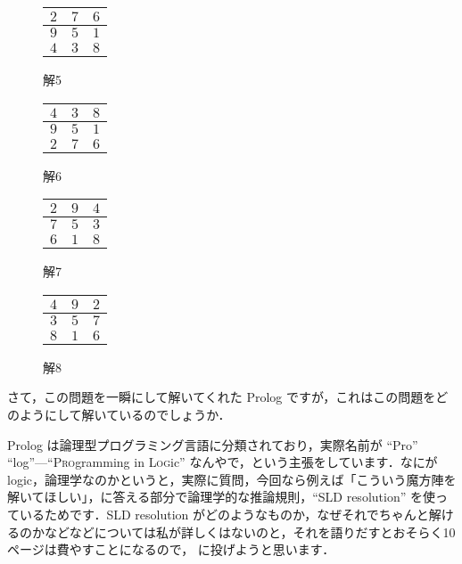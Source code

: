 \documentclass[11pt]{jsarticle}
\begin{document}
\begin{figure}[htbp]
  \captionsetup{labelformat=empty}
  \begin{minipage}{0.24\hsize}
    \centering
    \begin{tabular}{|c|c|c|}
      \hline
      $2$ & $7$ & $6$ \\ \hline
      $9$ & $5$ & $1$ \\ \hline
      $4$ & $3$ & $8$ \\ \hline
    \end{tabular}
    \caption{解5}
    \hypertarget{ans}{}
    \label{}
  \end{minipage}
  \begin{minipage}{0.24\hsize}
    \centering
    \begin{tabular}{|c|c|c|}
      \hline
      $4$ & $3$ & $8$ \\ \hline
      $9$ & $5$ & $1$ \\ \hline
      $2$ & $7$ & $6$ \\ \hline
    \end{tabular}
    \caption{解6}
    \label{}
  \end{minipage}
  \begin{minipage}{0.24\hsize}
    \centering
    \begin{tabular}{|c|c|c|}
      \hline
      $2$ & $9$ & $4$ \\ \hline
      $7$ & $5$ & $3$ \\ \hline
      $6$ & $1$ & $8$ \\ \hline
    \end{tabular}
    \caption{解7}
    \label{}
  \end{minipage}
  \begin{minipage}{0.24\hsize}
    \centering
    \begin{tabular}{|c|c|c|}
      \hline
      $4$ & $9$ & $2$ \\ \hline
      $3$ & $5$ & $7$ \\ \hline
      $8$ & $1$ & $6$ \\ \hline
    \end{tabular}
    \caption{解8}
    \label{}
  \end{minipage}
\end{figure}

さて，この問題を一瞬にして解いてくれた Prolog ですが，これはこの問題をどのようにして解いているのでしょうか．

Prolog は論理型プログラミング言語に分類されており，実際名前が ``Pro'' ``log''---``{\scshape Pro}gramming in {\scshape Log}ic'' なんやで，という主張をしています．なにが logic，論理学なのかというと，実際に質問，今回なら例えば「こういう魔方陣を解いてほしい」，に答える部分で論理学的な推論規則，``SLD resolution'' を使っているためです．SLD resolution がどのようなものか，なぜそれでちゃんと解けるのかなどなどについては私が詳しくはないのと，それを語りだすとおそらく10ページは費やすことになるので，\cite[Chapter 9]{gellier} に投げようと思います．
\end{document}
